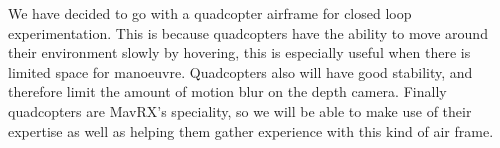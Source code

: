 \documentclass[]{article}
\begin{document}
{We have decided to go with a quadcopter airframe for closed loop experimentation. This is because quadcopters have the ability to move around their environment slowly by hovering, this is especially useful when there is limited space for manoeuvre. Quadcopters also will have good stability, and therefore limit the amount of motion blur on the depth camera. Finally quadcopters are MavRX's speciality, so we will be able to make use of their expertise as well as helping them gather experience with this kind of air frame. 








}
\end{document}
